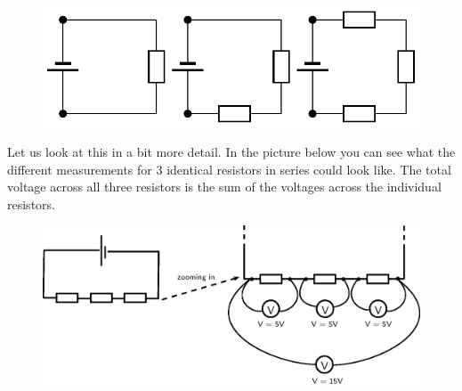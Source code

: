     \setcounter{subfigure}{0}


	\begin{figure}[H] %
    \begin{center}
    \label{m38776*id64087!!!underscore!!!media}\label{m38776*id64087!!!underscore!!!printimage}\includegraphics[width=\columnwidth]{col11305.imgs/m38776_PG10C9_018.png} %
        
      \vspace{2pt}
    \vspace{.1in}
    
    \end{center}

 \end{figure}   

    \addtocounter{footnote}{-0}
    
        \par 
        \label{m38776*id64094}Let us look at this in a bit more detail. In the picture below you can see what the different measurements for 3 identical resistors in series could look like. The total voltage across all three resistors is the sum of the voltages across the individual resistors. \par 
        \label{m38776*id64099}
          
    \setcounter{subfigure}{0}


	\begin{figure}[H] %
    \begin{center}
    \label{m38776*id64102!!!underscore!!!media}\label{m38776*id64102!!!underscore!!!printimage}\includegraphics{col11305.imgs/m38776_PG10C9_019.png} %
        
      \vspace{2pt}
    \vspace{.1in}
    
    \end{center}

 \end{figure}   


